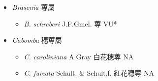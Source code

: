 
  \begin{itemize}
 \item[] \textit{Brasenia} 蓴屬
                                
  \begin{itemize}
        \item[] \textit{B. schreberi} J.F.Gmel.  蓴   VU*
  \end{itemize}
 \item[] \textit{Cabomba} 穗蓴屬
                                
  \begin{itemize}
        \item[] \textit{C. caroliniana} A.Gray  白花穗蓴   NA
        \item[] \textit{C. furcata} Schult. \& Schult.f.  紅花穗蓴   NA
  \end{itemize}
  \end{itemize}
